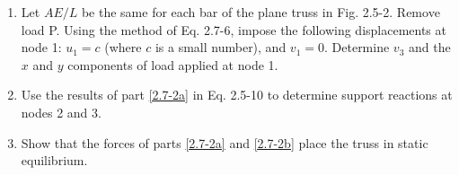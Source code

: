 \documentclass[../main.tex]{subfiles}
\begin{document}

\begin{enumerate}[label = (\alph*)]
    \item\label{2.7-2a} 
        Let $AE/L$ be the same for each bar of the plane truss in Fig. 2.5-2.
        Remove load P.
        Using the method of Eq. 2.7-6, impose the following displacements at node 1: \(u_1 = c\) (where $c$ is a small number), and \(v_1 = 0\).
        Determine $v_3$ and the $x$ and $y$ components of load applied at node 1.
         
    \item\label{2.7-2b}
        Use the results of part \ref{2.7-2a} in Eq. 2.5-10 to determine support reactions at nodes 2 and 3.
        
    \item
        Show that the forces of parts \ref{2.7-2a} and \ref{2.7-2b} place the truss in static equilibrium.
\end{enumerate}
\end{document}
